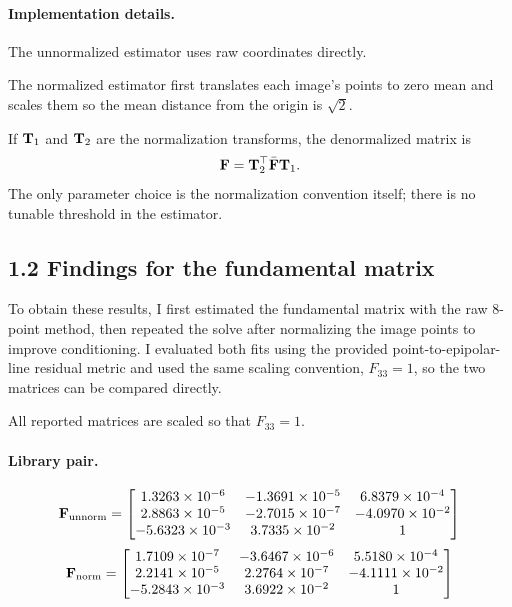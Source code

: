 {\paragraph{Implementation details.}
The unnormalized estimator uses raw coordinates directly.

The normalized estimator first translates each image's points to zero mean and scales them so the mean distance from the origin is $\sqrt{2}$.

If $\mathbf{T}_1$ and $\mathbf{T}_2$ are the normalization transforms, the denormalized matrix is
\begin{equation}
\mathbf{F} = \mathbf{T}_2^\top \bar{\mathbf{F}} \mathbf{T}_1.
\end{equation}
The only parameter choice is the normalization convention itself; there is no tunable threshold in the estimator.

\subsection*{1.2 Findings for the fundamental matrix}
To obtain these results, I first estimated the fundamental matrix with the raw 8-point method, then repeated the solve after normalizing the image points to improve conditioning. I evaluated both fits using the provided point-to-epipolar-line residual metric and used the same scaling convention, $F_{33}=1$, so the two matrices can be compared directly.

All reported matrices are scaled so that $F_{33}=1$.

\paragraph{Library pair.}
\begin{equation*}
\mathbf{F}_{\text{unnorm}} =
\begin{bmatrix}
1.3263\times 10^{-6} & -1.3691\times 10^{-5} & 6.8379\times 10^{-4}\\
2.8863\times 10^{-5} & -2.7015\times 10^{-7} & -4.0970\times 10^{-2}\\
-5.6323\times 10^{-3} & 3.7335\times 10^{-2} & 1
\end{bmatrix}
\end{equation*}
\begin{equation*}
\mathbf{F}_{\text{norm}} =
\begin{bmatrix}
1.7109\times 10^{-7} & -3.6467\times 10^{-6} & 5.5180\times 10^{-4}\\
2.2141\times 10^{-5} & 2.2764\times 10^{-7} & -4.1111\times 10^{-2}\\
-5.2843\times 10^{-3} & 3.6922\times 10^{-2} & 1
\end{bmatrix}
\end{equation*}

}
